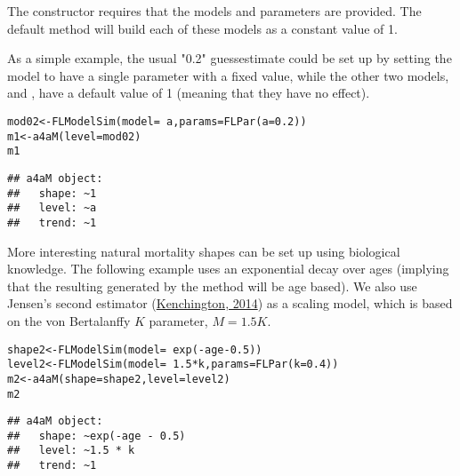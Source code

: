 \documentclass[a4paper,english,10pt]{article}\usepackage[]{graphicx}\usepackage[]{color}
\makeatletter
\newcommand{\hlnum}[1]{\textcolor[rgb]{0.063,0.58,0.627}{#1}}%
\newcommand{\hlopt}[1]{\textcolor[rgb]{0.196,0.196,0.196}{#1}}%
\newcommand{\hlstd}[1]{\textcolor[rgb]{0.196,0.196,0.196}{#1}}%
\newcommand{\hlkwb}[1]{\textcolor[rgb]{0.627,0,0.314}{#1}}%
\newcommand{\hlkwc}[1]{\textcolor[rgb]{0,0.631,0.314}{#1}}%
\newcommand{\hlkwd}[1]{\textcolor[rgb]{0.78,0.227,0.412}{#1}}%
\newenvironment{kframe}{%
 \def\at@end@of@kframe{}%
 \ifinner\ifhmode%
  \def\at@end@of@kframe{\end{minipage}}%
  \begin{minipage}{\columnwidth}%
 \fi\fi%
 \def\FrameCommand##1{\hskip\@totalleftmargin \hskip-\fboxsep
 \colorbox{shadecolor}{##1}\hskip-\fboxsep
     \hskip-\linewidth \hskip-\@totalleftmargin \hskip\columnwidth}%
 \MakeFramed {\advance\hsize-\width
   \@totalleftmargin\z@ \linewidth\hsize
   \@setminipage}}%
 {\par\unskip\endMakeFramed%
 \at@end@of@kframe}
\newenvironment{knitrout}{}{} %
\makeatother
\begin{document}
The  constructor requires that the models and parameters are provided. The default method will build each of these models as a constant value of 1.

As a simple example, the usual "0.2" guessestimate could be set up by setting the  model to have a single parameter with a fixed value, while the other two models,  and , have a default value of 1 (meaning that they have no effect).

\begin{knitrout}
\color{fgcolor}\begin{kframe}
\begin{alltt}
\hlstd{mod02} \hlkwb{<-} \hlkwd{FLModelSim}\hlstd{(}\hlkwc{model} \hlstd{=} \hlopt{~}\hlstd{a,} \hlkwc{params} \hlstd{=} \hlkwd{FLPar}\hlstd{(}\hlkwc{a} \hlstd{=} \hlnum{0.2}\hlstd{))}
\hlstd{m1} \hlkwb{<-} \hlkwd{a4aM}\hlstd{(}\hlkwc{level} \hlstd{= mod02)}
\hlstd{m1}
\end{alltt}
\begin{verbatim}
## a4aM object:
##   shape: ~1
##   level: ~a
##   trend: ~1
\end{verbatim}
\end{kframe}
\end{knitrout}

More interesting natural mortality shapes can be set up using biological knowledge. The following example uses an exponential decay over ages (implying that the resulting  generated by the  method will be age based). We also use Jensen's second estimator (\href{http://onlinelibrary.wiley.com/doi/10.1111/faf.12027/abstract}{Kenchington, 2014}) as a scaling  model, which is based on the von Bertalanffy $K$ parameter, $M=1.5K$. 

\begin{knitrout}
\color{fgcolor}\begin{kframe}
\begin{alltt}
\hlstd{shape2} \hlkwb{<-} \hlkwd{FLModelSim}\hlstd{(}\hlkwc{model} \hlstd{=} \hlopt{~}\hlkwd{exp}\hlstd{(}\hlopt{-}\hlstd{age} \hlopt{-} \hlnum{0.5}\hlstd{))}
\hlstd{level2} \hlkwb{<-} \hlkwd{FLModelSim}\hlstd{(}\hlkwc{model} \hlstd{=} \hlopt{~}\hlnum{1.5} \hlopt{*} \hlstd{k,} \hlkwc{params} \hlstd{=} \hlkwd{FLPar}\hlstd{(}\hlkwc{k} \hlstd{=} \hlnum{0.4}\hlstd{))}
\hlstd{m2} \hlkwb{<-} \hlkwd{a4aM}\hlstd{(}\hlkwc{shape} \hlstd{= shape2,} \hlkwc{level} \hlstd{= level2)}
\hlstd{m2}
\end{alltt}
\begin{verbatim}
## a4aM object:
##   shape: ~exp(-age - 0.5)
##   level: ~1.5 * k
##   trend: ~1
\end{verbatim}
\end{kframe}
\end{knitrout}
\end{document}
